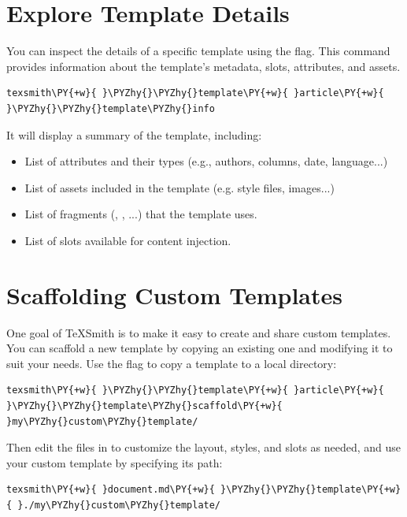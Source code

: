 \documentclass[a4paper,twoside]{article}
\begin{document}
\section{Explore Template Details}
You can inspect the details of a specific template using the  flag. This command provides information about the template's metadata, slots, attributes, and assets.
\begin{tscode}[lang=bash, engine=pygments]
\begin{Verbatim}[commandchars=\\\{\},breaklines, breakanywhere, commandchars=\\\{\}]
texsmith\PY{+w}{ }\PYZhy{}\PYZhy{}template\PY{+w}{ }article\PY{+w}{ }\PYZhy{}\PYZhy{}template\PYZhy{}info
\end{Verbatim}
\end{tscode}
It will display a summary of the template, including:
\begin{itemize}
\item List of attributes and their types (e.g., authors, columns, date, language...)
\item List of assets included in the template (e.g. style files, images...)
\item List of fragments (, , ...) that the template uses.
\item List of slots available for content injection.
\end{itemize}
\section{Scaffolding Custom Templates}
One goal of TeXSmith is to make it easy to create and share custom templates. You can scaffold a new template by copying an existing one and modifying it to suit your needs. Use the  flag to copy a template to a local directory:
\begin{tscode}[lang=bash, engine=pygments]
\begin{Verbatim}[commandchars=\\\{\},breaklines, breakanywhere, commandchars=\\\{\}]
texsmith\PY{+w}{ }\PYZhy{}\PYZhy{}template\PY{+w}{ }article\PY{+w}{ }\PYZhy{}\PYZhy{}template\PYZhy{}scaffold\PY{+w}{ }my\PYZhy{}custom\PYZhy{}template/
\end{Verbatim}
\end{tscode}
Then edit the files in  to customize the layout, styles, and slots as needed, and use your custom template by specifying its path:
\begin{tscode}[lang=bash, engine=pygments]
\begin{Verbatim}[commandchars=\\\{\},breaklines, breakanywhere, commandchars=\\\{\}]
texsmith\PY{+w}{ }document.md\PY{+w}{ }\PYZhy{}\PYZhy{}template\PY{+w}{ }./my\PYZhy{}custom\PYZhy{}template/
\end{Verbatim}
\end{tscode}
\end{document}

